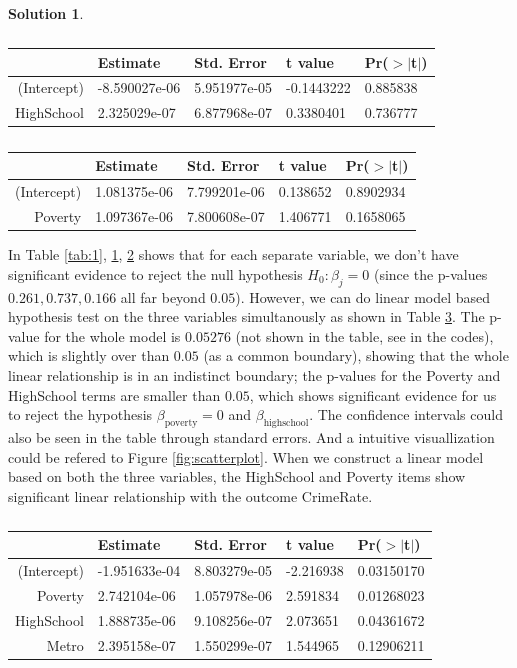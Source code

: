 \documentclass[11pt,letterpaper,english,oneside]{article} %
\theoremstyle{definition} %
\newtheorem{solution}{Solution}
\newenvironment{sol}{\begin{solution}\hspace{0pt}}{\end{solution}}
\begin{document}
\begin{sol}
\begin{itemize}
\begin{table}[h]
\centering
\begin{tabular}{rllll}
  \hline
 & Estimate & Std. Error & t value & Pr($>$$|$t$|$) \\ 
  \hline
(Intercept) & -8.590027e-06 & 5.951977e-05 & -0.1443222 & 0.885838 \\ 
  HighSchool &  2.325029e-07 & 6.877968e-07 &  0.3380401 & 0.736777 \\ 
   \hline
\end{tabular}
\caption{}
\label{tab:2}
\end{table}


\begin{table}[h]
\centering
\begin{tabular}{rllll}
  \hline
 & Estimate & Std. Error & t value & Pr($>$$|$t$|$) \\ 
  \hline
(Intercept) & 1.081375e-06 & 7.799201e-06 & 0.138652 & 0.8902934 \\ 
  Poverty & 1.097367e-06 & 7.800608e-07 & 1.406771 & 0.1658065 \\ 
   \hline
\end{tabular}
\caption{}
\label{tab:3}
\end{table}

In Table \ref{tab:1}, \ref{tab:2}, \ref{tab:3} shows that for each separate variable, we don't have significant evidence to reject the null hypothesis $H_0: \beta_j = 0$ (since the p-values $0.261, 0.737, 0.166$ all far beyond $0.05$). However, we can do linear model based hypothesis test on the three variables simultanously as shown in Table \ref{tab:4}. The p-value for the whole model is $0.05276$ (not shown in the table, see in the codes), which is slightly over than $0.05$ (as a common boundary), showing that the whole linear relationship is in an indistinct boundary; the p-values for the Poverty and HighSchool terms are smaller than $0.05$, which shows significant evidence for us to reject the hypothesis $\beta_{\text{poverty}} = 0$ and $\beta_{\text{highschool}}$. The confidence intervals could also be seen in the table through standard errors. And a intuitive visuallization could be refered to Figure \ref{fig:scatterplot}. When we construct a linear model based on both the three variables, the HighSchool and Poverty items show significant linear relationship with the outcome CrimeRate.

\begin{table}[h]
\centering
\begin{tabular}{rllll}
  \hline
 & Estimate & Std. Error & t value & Pr($>$$|$t$|$) \\ 
  \hline
(Intercept) & -1.951633e-04 & 8.803279e-05 & -2.216938 & 0.03150170 \\ 
  Poverty &  2.742104e-06 & 1.057978e-06 &  2.591834 & 0.01268023 \\ 
  HighSchool &  1.888735e-06 & 9.108256e-07 &  2.073651 & 0.04361672 \\ 
  Metro &  2.395158e-07 & 1.550299e-07 &  1.544965 & 0.12906211 \\ 
   \hline
\end{tabular}
\caption{}
\label{tab:4}
\end{table}


\end{itemize}
\end{sol}
\end{document}
